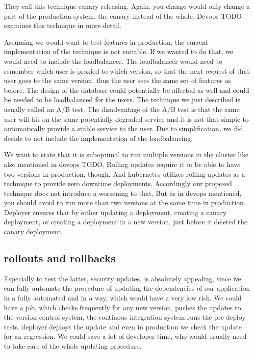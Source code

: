 They call this technique canary releasing. Again, you change would only change a part of
the production system, the canary instead of the whole. Devops TODO examines this
technique in more detail.

Assuming we would want to test features in production, the current implementation of the
technique is not suitable. If we wanted to do that, we would need to include the
loadbalancer. The loadbalancer would need to remember which user is proxied to which
version, so that the next request of that user goes to the same version, thus the user
sees the same set of features as before. The design of the database could potentially be
affected as well and could be needed to be loadbalanced for the users. The technique we
just described is usually called an A/B test. The disadvantage of the A/B test is that the
same user will hit on the same potentially degraded service and it is not that simple to
automatically provide a stable service to the user. Due to simplification, we did decide
to not include the implementation of the loadbalancing.

We want to state that it is suboptimal to run multiple versions in the cluster like also
mentioned in devops TODO. Rolling updates require it to be able to have two versions in
production, though. And kubernetes utilizes rolling updates as a technique to provide zero
downtime deployments. Accordingly our proposed technique does not introduce a worsening to
that. But as in devops mentioned, you should avoid to run more than two versions at the
same time in production. Deployer ensures that by either updating a deployment, creating a
canary deployment, or creating a deployment in a new version, just before it deleted the
canary deployment.

\subsection{rollouts and rollbacks}
Especially to test the latter, security updates, is absolutely appealing, since we can
fully automate the procedure of updating the dependencies of our application in a fully
automated and in a way, which would have a very low risk. We could have a job, which
checks frequently for any new version, pushes the updates to the version control system,
the continous integration system runs the pre deploy tests, deployer deploys the update
and even in production we check the update for an regression. We could save a lot of
developer time, who would usually need to take care of the whole updating procedure.

